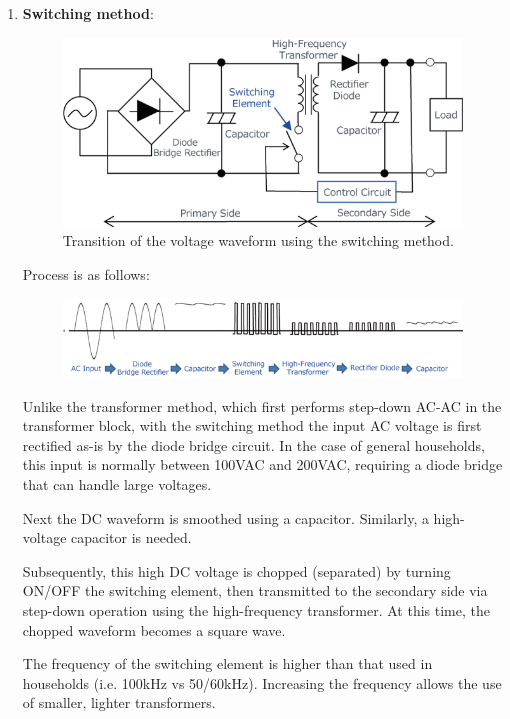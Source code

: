 \begin{enumerate}
    \item \textbf{Switching method}: 
    \begin{figure}[H]
        \centering
        \includegraphics[scale=0.5]{figs/ch03/switching_schematic.png}
        \caption{Transition of the voltage waveform using the switching method.}
        \label{fig:switching_method}
    \end{figure}
    Process is as follows:
    \begin{figure}[H]
        \centering
        \includegraphics[scale=0.6]{figs/ch03/switching_process.png}
    \end{figure}
    Unlike the transformer method, which first performs step-down AC-AC in the transformer block, with the switching method the input AC voltage is first rectified as-is by the diode bridge circuit. In the case of general households, this input is normally between 100VAC and 200VAC, requiring a diode bridge that can handle large voltages.

    Next the DC waveform is smoothed using a capacitor. Similarly, a high-voltage capacitor is needed.

    Subsequently, this high DC voltage is chopped (separated) by turning ON/OFF the switching element, then transmitted to the secondary side via step-down operation using the high-frequency transformer. At this time, the chopped waveform becomes a square wave.

    The frequency of the switching element is higher than that used in households (i.e. 100kHz vs 50/60kHz). Increasing the frequency allows the use of smaller, lighter transformers.


\end{enumerate}
